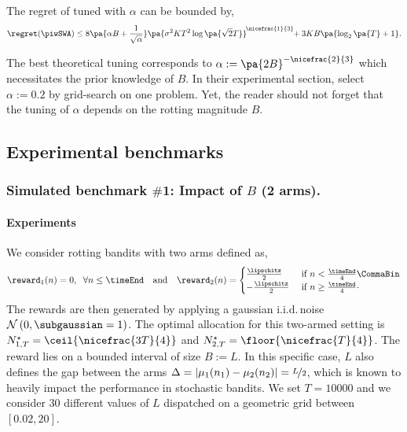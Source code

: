 \begin{corollary}
\label{cor:wSWA}
The regret of \wSWA tuned with $\alpha$ can be bounded by,
\[
\regret(\piwSWA) \leq 8 \pa{\alpha B + \frac{1}{\sqrt{\alpha} }} \pa{ \sigma^2 K T^2 \log\pa{\sqrt{2}T}}^{\!\nicefrac{1}{3}\!} \!+ 3KB\pa{\log_2\pa{T} +1} . 
\]
\end{corollary}

The best theoretical tuning corresponds to $\alpha := \pa{2B}^{-\nicefrac{2}{3}}$ which necessitates the prior knowledge of $B$. In their experimental section, \citet{levine2017rotting} select $\alpha:= 0.2$ by grid-search on one problem. Yet, the reader should not forget that the tuning of $\alpha$ depends on the rotting magnitude $B$.

\subsection{Experimental benchmarks}
\label{subsec:rested-experiment1}
\subsubsection{Simulated benchmark $\#$1: Impact of $B$ (2 arms).}

\paragraph{Experiments} We consider rotting bandits with two arms defined as,
%
\begin{align*}
\reward_1(n) = 0, \;\; \forall n \leq \timeEnd \quad \text{and}  \quad
\reward_2(n) = \begin{cases}
\frac{\lipschitz}{2}  & \text{ if } n < \frac{\timeEnd}{4}\CommaBin \\
-\frac{\lipschitz}{2} & \text{ if } n \geq \frac{\timeEnd}{4}\cdot
\end{cases}
\end{align*}
%
The rewards are then generated by applying a gaussian i.i.d.\,noise $\mathcal{N}\left(0,\subgaussian = 1\right)$. The optimal allocation for this two-armed setting is $N_{1,T}^\star = \ceil{\nicefrac{3T}{4}}$ and $N_{2,T}^\star=\floor{\nicefrac{T}{4}}$. The reward lies on a bounded interval of size $B := L$. In this specific case, $L$ also defines the gap between the arms $\Delta = |\mu_1(n_1) - \mu_2(n_2)| = \nicefrac{L}{2}$, which is known to heavily impact the performance in stochastic bandits. We set $T=10 000$ and we consider 30 different values of $L$ dispatched on a geometric grid between $\left[0.02, 20\right]$.

